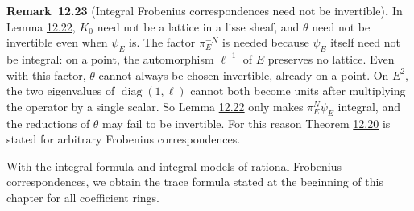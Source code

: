 \documentclass[11pt]{article}
\newenvironment{bpstatement}[2]{\par\addvspace{0.6\baselineskip}\noindent\textbf{#1}#2\textbf{.}\enspace\ignorespaces}
  {\par\addvspace{0.4\baselineskip}}
\begin{document}
\label{bp296}%
\begin{bpstatement}{Remark~12.23}{ (Integral Frobenius correspondences need not be invertible)}
In Lemma \hyperref[bp294]{12.22}, \(K_0\) need not be a lattice in a lisse sheaf, and \(\theta\) need not be invertible even when \(\psi_E\) is. The factor \(\pi_E^{-N}\) is needed because \(\psi_E\) itself need not be integral: on a point, the automorphism \(\ell^{-1}\) of \(E\) preserves no lattice. Even with this factor, \(\theta\) cannot always be chosen invertible, already on a point. On \(E^2\), the two eigenvalues of \(\operatorname{diag}(1,\ell)\) cannot both become units after multiplying the operator by a single scalar. So Lemma \hyperref[bp294]{12.22} only makes \(\pi_E^N\psi_E\) integral, and the reductions of \(\theta\) may fail to be invertible. For this reason Theorem \hyperref[bp287]{12.20} is stated for arbitrary Frobenius correspondences.
\end{bpstatement}

\label{bp297}%
With the integral formula and integral models of rational Frobenius correspondences, we obtain the trace formula stated at the beginning of this chapter for all coefficient rings.
\end{document}
